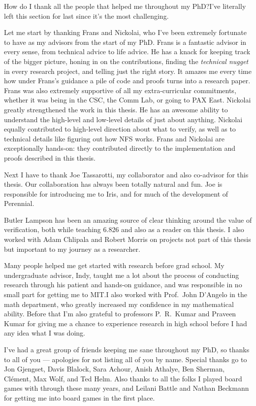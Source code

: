How do I thank all the people that helped me throughout my PhD?\@ I've literally
left this section for last since it's the most challenging.

Let me start by thanking Frans and Nickolai, who I've been extremely fortunate
to have as my advisors from the start of my PhD. Frans is a fantastic advisor in
every sense, from technical advice to life advice. He has a knack for keeping
track of the bigger picture, honing in on the contributions, finding the
\emph{technical nugget} in every research project, and telling just the right
story. It amazes me every time how under Frans's guidance a pile of code and
proofs turns into a research paper. Frans was also extremely supportive of all
my extra-curricular commitments, whether it was being in the CSC, the Comm Lab,
or going to PAX East. Nickolai greatly strengthened the work in this thesis. He
has an awesome ability to understand the high-level and low-level details of
just about anything. Nickolai equally contributed to high-level direction about
what to verify, as well as to technical details like figuring out how NFS works.
Frans and Nickolai are exceptionally hands-on: they contributed directly to the
implementation and proofs described in this thesis.

Next I have to thank Joe Tassarotti, my collaborator and also co-advisor for
this thesis. Our collaboration has always been totally natural and fun. Joe is
responsible for introducing me to Iris, and for much of the development of
Perennial.

Butler Lampson has been an amazing source of clear thinking around the value of
verification, both while teaching 6.826 and also as a reader on this thesis. I
also worked with Adam Chlipala and Robert Morris on projects not part of this
thesis but important to my journey as a researcher.

Many people helped me get started with research before grad school. My
undergraduate advisor, Indy, taught me a lot about the process of conducting
research through his patient and hands-on guidance, and was responsible in no
small part for getting me to MIT.\@ I also worked with Prof.~John D'Angelo in
the math department, who greatly increased my confidence in my mathematical
ability. Before that I'm also grateful to professors P.~R.~Kumar and Praveen
Kumar for giving me a chance to experience research in high school before I had
any idea what I was doing.

I've had a great group of friends keeping me sane throughout my PhD, so thanks
to all of you --- apologies for not listing all of you by name. Special thanks
go to Jon Gjengset, Davis Blalock, Sara Achour, Anish Athalye, Ben Sherman,
Cl\'ement, Max Wolf, and Ted Helm. Also thanks to all the folks I played board
games with through these many years, and Leilani Battle and Nathan Beckmann for
getting me into board games in the first place.

